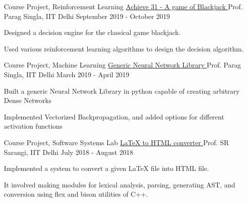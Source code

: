 \begin{cventries}
        
    \cventry
        {Course Project, Reinforcement Learning} %
        {\href{https://github.com/gprateek93/COL870-Reinforcement_Learning}{Achieve 31 - A game of Blackjack \ExternalLink}} %
        {Prof. Parag Singla, IIT Delhi} %
        {September 2019 - October 2019} %
        {
            \begin{cvitems} %
                \item Designed a decision engine for the classical game blackjack.
                \item Used various reinforcement learning algorithms to design the decision algorithm.
            \end{cvitems}
        }
    
    \cventry
        {Course Project, Machine Learning} %
        {\href{https://github.com/gprateek93/Machine-Learning-COL-774/tree/master/Assignment-3}{Generic Neural Network Library \ExternalLink}} %
        {Prof. Parag Singla, IIT Delhi} %
        {March 2019 - April 2019} %
        {
            \begin{cvitems} %
                \item Built a generic Neural Network Library in python capable of creating arbitrary Dense Networks
                \item Implemented Vectorized Backpropagation, and added options for different activation functions
            \end{cvitems}
        }
        
    
    \cventry
        {Course Project, Software Systems Lab} %
        {\href{https://github.com/gprateek93/LaTeX_to_HTML}{LaTeX to HTML converter \ExternalLink}} %
        {Prof. SR Sarangi, IIT Delhi} %
        {July 2018 - August 2018} %
        {
            \begin{cvitems} %
                \item Implemented a system to convert a given LaTeX file into HTML file. 
                \item It involved making modules for lexical analysis, parsing, generating AST, and conversion using flex and bison utilities of C++.
            \end{cvitems}
        }
    
    
\end{cventries}
